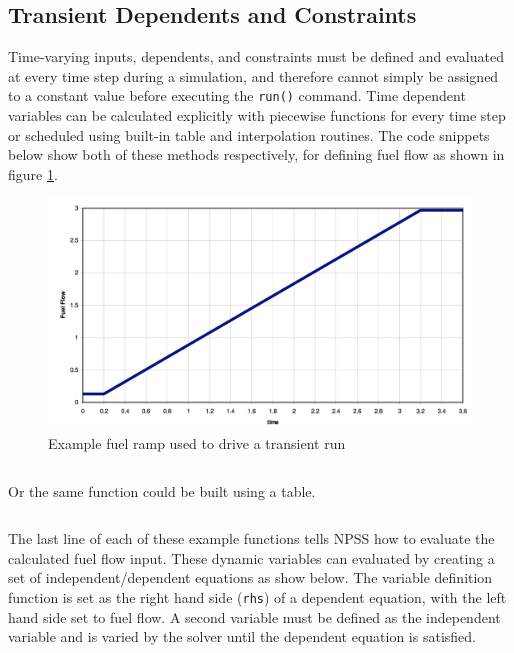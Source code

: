 \documentclass[heading.tex]{subfiles}
\begin{document}
\subsection{Transient Dependents and Constraints}

Time-varying inputs, dependents, and constraints must be defined and evaluated at every time step during a simulation, and therefore cannot simply be
assigned to a constant value before executing the \texttt{run()} command. Time dependent variables can be calculated explicitly with
piecewise functions for every time step or scheduled using built-in table and interpolation routines.
The code snippets below show both of these methods respectively, for defining fuel flow as shown in figure \ref{f:ramp}.

\begin{figure}[H]
\centering
\includegraphics[width=1.0\textwidth]{images/fuelRamp}
\caption{Example fuel ramp used to drive a transient run}
\label{f:ramp}
\end{figure}

\begin{adjustwidth}{-1cm}{-1cm}
 \inputminted[]{c++}{code/rampFn}
 \end{adjustwidth} 
 
Or the same function could be built using a table. 
 
 \begin{adjustwidth}{-1cm}{-1cm}
 \inputminted[]{c++}{code/rampTb}
 \end{adjustwidth} 

The last line of each of these example functions tells NPSS how to evaluate the calculated fuel flow input.
These dynamic variables can evaluated by creating a set of independent/dependent equations as show below.
The variable definition function is set as the right hand side (\texttt{rhs}) of a dependent equation,
with the left hand side set to fuel flow. 
A second variable must be defined as the independent variable and is varied by the solver until the dependent equation is satisfied.
\end{document}
